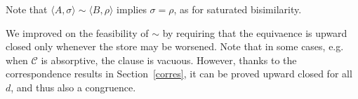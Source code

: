 \documentclass{llncs}
\newcommand{\comment}[1]{}
\def\monid{{\mathbf 0}}
\def\monid{\mathbf{1}}
\begin{document}
Note that $\langle A, \sigma \rangle \sim \langle B, \rho \rangle$ implies
$\sigma = \rho$, as for saturated bisimilarity.
%
\comment{
\begin{definition}[Weak bisimilarity]\label{def:weakbis} A weak bisimulation is a symmetric relation $R$ on configurations such that whenever
$( \langle A, \sigma \rangle,\langle B, \rho \rangle) \in R$
\begin{enumerate}
\item if $\langle A, \sigma \rangle \downarrow_c$ then $\langle B, \rho \rangle \Downarrow_c$;
\item if $\langle A, \sigma \rangle \xrightarrow{\alpha} \gamma_1$ then there is $\gamma_2$ such that $\langle B, \rho \otimes \alpha \rangle \Rightarrow \gamma_2$ 
and $(\gamma_1, \gamma_2) \in R$;
\end{enumerate}
We say that $\gamma_1$ and $\gamma_2$ are  weakly bisimilar ($\gamma_1  \approx \gamma_2$) if there exists a  
weak  bisimulation $R$ such that $(\gamma_1 , \gamma_2 ) \in R$. 
We write $A \approx B$ if $\langle A, \monid \rangle \approx \langle B, \monid \rangle$.
\end{definition}

\begin{lemma}[Weak bisimilarity, 2]\label{def:weakbis2}
Weak bisimilarity coincides with the relation 
obtained from Definition~\ref{def:strongbis} by replacing $\to$ with $\Rightarrow$ and $\downarrow_c$ with $\Downarrow_c$.
\end{lemma}

\begin{proposition}
Let $\langle A,\sigma \rangle, \langle B,\rho \rangle$ be configurations 
and $c, d \in \mathcal{C}$.
If $\langle A,\sigma \rangle \approx \langle B,\rho \rangle$
and $\langle A,\sigma \otimes d\rangle \downarrow_c$ then 
then $\langle B, \rho \otimes d\rangle \Downarrow_c$.
\end{proposition}
}
%
We improved on the feasibility of $\sim$ by requiring that the equivaence is upward closed 
only whenever the store may be worsened. Note that in some cases, e.g. 
when $\mathcal{C}$ is absorptive, the clause is vacuous. 
%
However, thanks to the correspondence results in Section~\ref{corres}, 
it can be proved upward closed for all $d$, and thus also a congruence.
%
\end{document}
